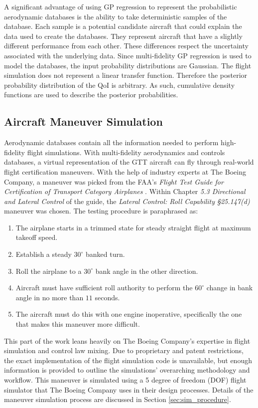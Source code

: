A significant advantage of using GP regression to represent the probabilistic aerodynamic databases is the ability to take deterministic samples of the database.
Each sample is a potential candidate aircraft that could explain the data used to create the databases. 
They represent aircraft that have a slightly different performance from each other. 
These differences respect the uncertainty associated with the underlying data.
Since multi-fidelity GP regression is used to model the databases, the input probability distributions are Gaussian. 
The flight simulation does not represent a linear transfer function.
Therefore the posterior probability distribution of the QoI is arbitrary. 
As such, cumulative density functions are used to describe the posterior probabilities. 

\subsection{Aircraft Maneuver Simulation}

Aerodynamic databases contain all the information needed to perform high-fidelity flight simulations.
With multi-fidelity aerodynamics and controls databases, a virtual representation of the GTT aircraft can fly through real-world flight certification maneuvers. 
With the help of industry experts at The Boeing Company, a maneuver was picked from the FAA's \textit{Flight Test Guide for Certification of Transport Category Airplanes} \cite{romanowski_flight_2018}.
Within Chapter \textit{5.3 Directional and Lateral Control} of the guide, the \textit{Lateral Control: Roll Capability \S 25.147(d)} maneuver was chosen.   
The testing procedure is paraphrased as: 
\begin{enumerate}
    \item The airplane starts in a trimmed state for steady straight flight at maximum takeoff speed.
    \item Establish a steady $30^\circ$ banked turn.
    \item Roll the airplane to a $30^\circ$ bank angle in the other direction.
    \item Aircraft must have sufficient roll authority to perform the $60^\circ$ change in bank angle in no more than $11$ seconds. 
    \item The aircraft must do this with one engine inoperative, specifically the one that makes this maneuver more difficult.

\end{enumerate}

This part of the work leans heavily on The Boeing Company's expertise in flight simulation and control law mixing.
Due to proprietary and patent restrictions, the exact implementation of the flight simulation code is unavailable, but enough information is provided to outline the simulations' overarching methodology and workflow.
This maneuver is simulated using a 5 degree of freedom (DOF) flight simulator that The Boeing Company uses in their design processes.
Details of the maneuver simulation process are discussed in Section \ref{sec:sim_procedure}.